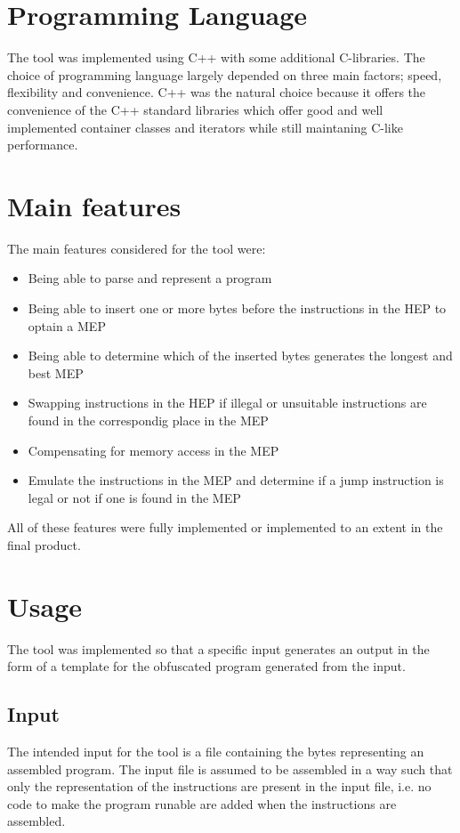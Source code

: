 \documentclass[11pt,twoside]{eitExjobb}
\begin{document}
\section{Programming Language}
The tool was implemented using C++ with some additional C-libraries. The choice of programming language largely depended on three main factors; speed, flexibility and convenience. C++ was the natural choice because it offers the convenience of the C++ standard libraries which offer good and well implemented container classes and iterators while still maintaning C-like performance.

\section{Main features}
The main features considered for the tool were:

\begin{itemize}
\item{Being able to parse and represent a program}
\item{Being able to insert one or more bytes before the instructions in the HEP to optain a MEP}
\item{Being able to determine which of the inserted bytes generates the longest and best MEP}
\item{Swapping instructions in the HEP if illegal or unsuitable instructions are found in the correspondig place in the MEP}
\item{Compensating for memory access in the MEP}
\item{Emulate the instructions in the MEP and determine if a jump instruction is legal or not if one is found in the MEP}
\end{itemize}

\noindent All of these features were fully implemented or implemented to an extent in the final product. 

\section{Usage}
The tool was implemented so that a specific input generates an output in the form of a template for the obfuscated program generated from the input.  

\subsection{Input}
The intended input for the tool is a file containing the bytes representing an assembled program. The input file is assumed to be assembled in a way such that only the representation of the instructions are present in the input file, i.e. no code to make the program runable are added when the instructions are assembled.
\end{document}
